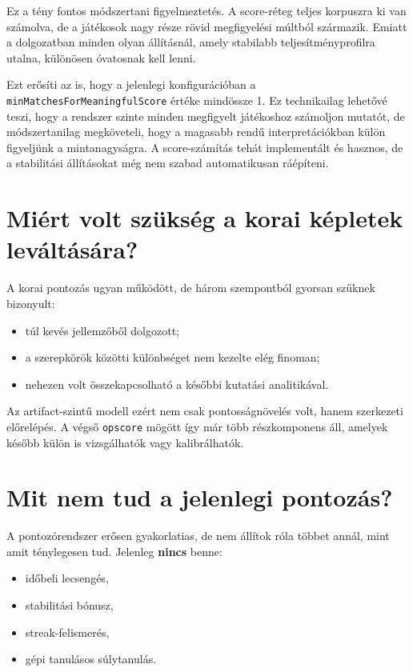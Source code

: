 \documentclass[a4paper,12pt]{report}
\begin{document}
Ez a tény fontos módszertani figyelmeztetés. A score-réteg teljes korpuszra ki van számolva, de a játékosok nagy része rövid megfigyelési múltból származik. Emiatt a dolgozatban minden olyan állításnál, amely stabilabb teljesítményprofilra utalna, különösen óvatosnak kell lenni.

Ezt erősíti az is, hogy a jelenlegi konfigurációban a \texttt{minMatchesForMeaningfulScore} értéke mindössze 1. Ez technikailag lehetővé teszi, hogy a rendszer szinte minden megfigyelt játékoshoz számoljon mutatót, de módszertanilag megköveteli, hogy a magasabb rendű interpretációkban külön figyeljünk a mintanagyságra. A score-számítás tehát implementált és hasznos, de a stabilitási állításokat még nem szabad automatikusan ráépíteni.

\section{Miért volt szükség a korai képletek leváltására?}

A korai pontozás ugyan működött, de három szempontból gyorsan szűknek bizonyult:

\begin{itemize}
    \item túl kevés jellemzőből dolgozott;
    \item a szerepkörök közötti különbséget nem kezelte elég finoman;
    \item nehezen volt összekapcsolható a későbbi kutatási analitikával.
\end{itemize}

Az artifact-szintű modell ezért nem csak pontosságnövelés volt, hanem szerkezeti előrelépés. A végső \texttt{opscore} mögött így már több részkomponens áll, amelyek később külön is vizsgálhatók vagy kalibrálhatók.

\section{Mit nem tud a jelenlegi pontozás?}

A pontozórendszer erősen gyakorlatias, de nem állítok róla többet annál, mint amit ténylegesen tud. Jelenleg \textbf{nincs} benne:

\begin{itemize}
    \item időbeli lecsengés,
    \item stabilitási bónusz,
    \item streak-felismerés,
    \item gépi tanulásos súlytanulás.
\end{itemize}
\end{document}
